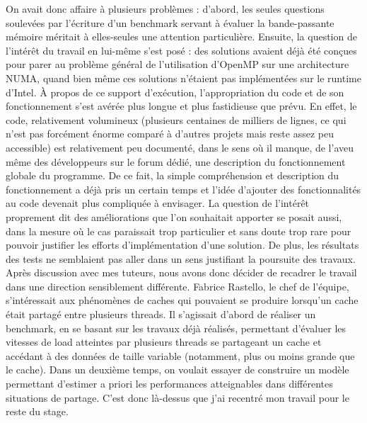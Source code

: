\documentclass{report}
\begin{document}
On avait donc affaire à plusieurs problèmes : d'abord, les seules questions soulevées par l'écriture d'un
benchmark servant à évaluer la bande-passante mémoire méritait à elles-seules une attention particulière.
Ensuite, la question de l'intérêt du travail en lui-même s'est posé : des solutions avaient déjà été 
conçues pour parer au problème général de l'utilisation d'OpenMP sur une architecture NUMA, quand bien
même ces solutions n'étaient pas implémentées sur le runtime d'Intel. À propos de ce support d'exécution,
l'appropriation du code et de son fonctionnement s'est avérée plus longue et plus fastidieuse que prévu.
En effet, le code, relativement volumineux (plusieurs centaines de milliers de lignes, ce qui n'est pas
forcément énorme comparé à d'autres projets mais reste assez peu accessible) est relativement peu documenté,
dans le sens où il manque, de l'aveu même des développeurs sur le forum dédié, une description du 
fonctionnement globale du programme. De ce fait, la simple compréhension et description du fonctionnement
a déjà pris un certain temps et l'idée d'ajouter des fonctionnalités au code devenait plus compliquée à
envisager. La question de l'intérêt proprement dit des améliorations que l'on souhaitait apporter se posait
aussi, dans la mesure où le cas paraissait trop particulier et sans doute trop rare pour pouvoir justifier
les efforts d'implémentation d'une solution. De plus, les résultats des tests ne semblaient pas aller dans 
un sens justifiant la poursuite des travaux.
\\Après discussion avec mes tuteurs, nous avons donc décider de recadrer le travail dans une direction 
sensiblement différente. Fabrice Rastello, le chef de l'équipe, s'intéressait aux phénomènes de caches
qui pouvaient se produire lorsqu'un cache était partagé entre plusieurs threads. Il s'agissait d'abord
de réaliser un benchmark, en se basant sur les travaux déjà réalisés, permettant d'évaluer les vitesses
de load atteintes par plusieurs threads se partageant un cache et accédant à des données de taille 
variable (notamment, plus ou moins grande que le cache). Dans un deuxième temps, on voulait essayer de
construire un modèle permettant d'estimer a priori les performances atteignables dans différentes 
situations de partage. C'est donc là-dessus que j'ai recentré mon travail pour le reste du stage.



\end{document}
